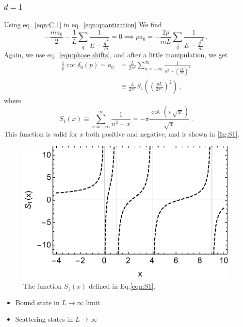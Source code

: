 \documentclass[11pt]{article}
\begin{document}
\subsubsection{$d=1$}
Using eq.~\eqref{eqn:C 1} in eq.~\eqref{eqn:quantization} We find
\begin{equation}
-\frac{ma_0}{2}-\frac{1}{L}\sum_{\vec{q}} \frac { 1 } { E - \frac{\vec{q}^2}{m} }=0
\implies
p a_0=-\frac{2p}{mL}\sum_{\vec{q}} \frac { 1 } { E - \frac{\vec{q}^2}{m} }\ .
\end{equation}
Again, we use eq.~\eqref{eqn:phase shifts}, and after a little manipulation, we get
\begin{align}
\frac{1}{p}\cot\delta_0(p)=a_0&=\frac{L}{2\pi^2}\sum_{n=-\infty}^{\infty} \frac { 1 } { n^2 -\left(\frac{pL}{2\pi}\right)^2}\\
 &\equiv\frac{L}{2\pi^2} S_1\left(\left(\frac{pL}{2\pi^2}\right)^2\right)\ ,
\end{align}
where
\begin{equation}\label{eqn:S1}
S_1(x)\equiv\sum_{n=-\infty}^{\infty} \frac { 1 } { n^2 -x}=-\pi\frac{\cot(\pi\sqrt{x})}{\sqrt{x}}\ .
\end{equation}
This function is valid for $x$ both positive and negative, and is shown in \autoref{fig:S1}.
\begin{figure}
\center
\includegraphics[width=.8\columnwidth]{figure/S1.pdf}
\caption{The function $S_1(x)$ defined in Eq.\eqref{eqn:S1}.\label{fig:S1}}
\end{figure}

\begin{itemize}
\item Bound state in $L\to\infty$ limit
\item Scattering states in $L\to\infty$
\end{itemize}
\end{document}
